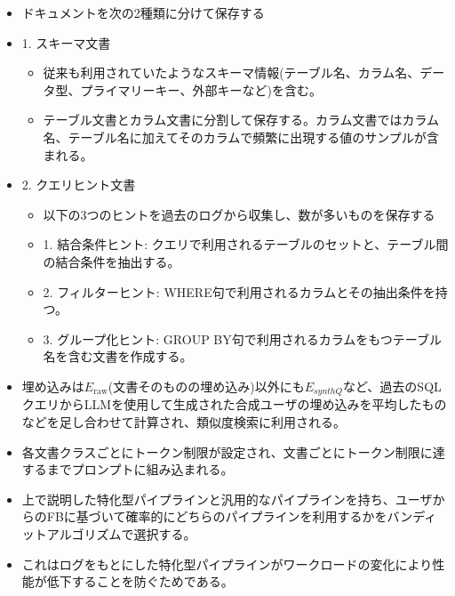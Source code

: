 \documentclass[dvipdfmx,uplatex]{jsarticle}
\theoremstyle{remark}
\newenvironment{method}[1]{
    \begin{tcolorbox}[
        colframe=green!50!black,
        colback=green!50!black!10!white,
        colbacktitle=green!50!black!40!white,
        coltitle=black,
        fonttitle=\bfseries,
        title={#1}
    ]
}{
    \end{tcolorbox}
}
\begin{document}
\begin{method}{ドキュメントの構成とプロンプトへの組み込み}
\begin{itemize}
    \item ドキュメントを次の2種類に分けて保存する
    \item 1. スキーマ文書
    \begin{itemize}
        \item 従来も利用されていたようなスキーマ情報(テーブル名、カラム名、データ型、プライマリーキー、外部キーなど)を含む。
        \item テーブル文書とカラム文書に分割して保存する。カラム文書ではカラム名、テーブル名に加えてそのカラムで頻繁に出現する値のサンプルが含まれる。
    \end{itemize}
    \item 2. クエリヒント文書
    \begin{itemize}
        \item 以下の3つのヒントを過去のログから収集し、数が多いものを保存する
        \item 1. 結合条件ヒント: クエリで利用されるテーブルのセットと、テーブル間の結合条件を抽出する。
        \item 2. フィルターヒント: WHERE句で利用されるカラムとその抽出条件を持つ。
        \item 3. グループ化ヒント: GROUP BY句で利用されるカラムをもつテーブル名を含む文書を作成する。
    \end{itemize}
    \item 埋め込みは$E_\mathrm{raw}$(文書そのものの埋め込み)以外にも$E_{synthQ}$など、過去のSQLクエリからLLMを使用して生成された合成ユーザの埋め込みを平均したものなどを足し合わせて計算され、類似度検索に利用される。
    \item 各文書クラスごとにトークン制限が設定され、文書ごとにトークン制限に達するまでプロンプトに組み込まれる。
\end{itemize}
\end{method}

\begin{method}{棄権ポリシー}
\begin{itemize}
    \item 上で説明した特化型パイプラインと汎用的なパイプラインを持ち、ユーザからのFBに基づいて確率的にどちらのパイプラインを利用するかをバンディットアルゴリズムで選択する。
    \item これはログをもとにした特化型パイプラインがワークロードの変化により性能が低下することを防ぐためである。
\end{itemize}
\end{method}
\end{document}
